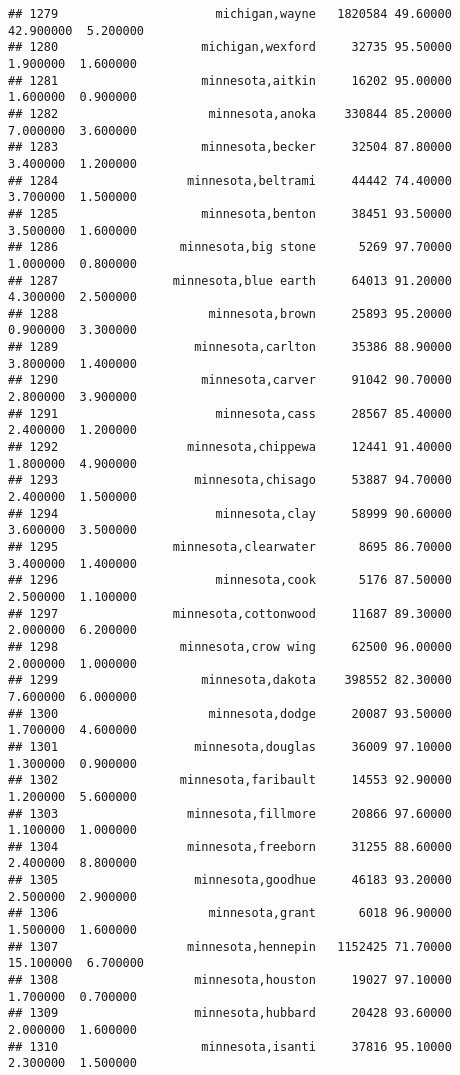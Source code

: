 \documentclass[
]{article}
\begin{document}
\begin{verbatim}
## 1279                      michigan,wayne   1820584 49.60000 42.900000  5.200000
## 1280                    michigan,wexford     32735 95.50000  1.900000  1.600000
## 1281                    minnesota,aitkin     16202 95.00000  1.600000  0.900000
## 1282                     minnesota,anoka    330844 85.20000  7.000000  3.600000
## 1283                    minnesota,becker     32504 87.80000  3.400000  1.200000
## 1284                  minnesota,beltrami     44442 74.40000  3.700000  1.500000
## 1285                    minnesota,benton     38451 93.50000  3.500000  1.600000
## 1286                 minnesota,big stone      5269 97.70000  1.000000  0.800000
## 1287                minnesota,blue earth     64013 91.20000  4.300000  2.500000
## 1288                     minnesota,brown     25893 95.20000  0.900000  3.300000
## 1289                   minnesota,carlton     35386 88.90000  3.800000  1.400000
## 1290                    minnesota,carver     91042 90.70000  2.800000  3.900000
## 1291                      minnesota,cass     28567 85.40000  2.400000  1.200000
## 1292                  minnesota,chippewa     12441 91.40000  1.800000  4.900000
## 1293                   minnesota,chisago     53887 94.70000  2.400000  1.500000
## 1294                      minnesota,clay     58999 90.60000  3.600000  3.500000
## 1295                minnesota,clearwater      8695 86.70000  3.400000  1.400000
## 1296                      minnesota,cook      5176 87.50000  2.500000  1.100000
## 1297                minnesota,cottonwood     11687 89.30000  2.000000  6.200000
## 1298                 minnesota,crow wing     62500 96.00000  2.000000  1.000000
## 1299                    minnesota,dakota    398552 82.30000  7.600000  6.000000
## 1300                     minnesota,dodge     20087 93.50000  1.700000  4.600000
## 1301                   minnesota,douglas     36009 97.10000  1.300000  0.900000
## 1302                 minnesota,faribault     14553 92.90000  1.200000  5.600000
## 1303                  minnesota,fillmore     20866 97.60000  1.100000  1.000000
## 1304                  minnesota,freeborn     31255 88.60000  2.400000  8.800000
## 1305                   minnesota,goodhue     46183 93.20000  2.500000  2.900000
## 1306                     minnesota,grant      6018 96.90000  1.500000  1.600000
## 1307                  minnesota,hennepin   1152425 71.70000 15.100000  6.700000
## 1308                   minnesota,houston     19027 97.10000  1.700000  0.700000
## 1309                   minnesota,hubbard     20428 93.60000  2.000000  1.600000
## 1310                    minnesota,isanti     37816 95.10000  2.300000  1.500000

\end{verbatim}
\end{document}
